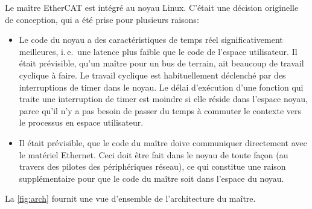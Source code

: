\documentclass[a4paper,12pt,BCOR6mm,bibtotoc,idxtotoc]{scrbook}
\begin{document}
Le ma\^itre EtherCAT est int\'egr\'e au noyau Linux. C'\'etait une
d\'ecision originelle de conception, qui a \'et\'e prise pour
plusieurs raisons:

\begin{itemize}

\item Le code du noyau a des caract\'eristiques de temps r\'eel
  significativement meilleures, i.\,e.\ une latence plus faible que le
  code de l'espace utilisateur. Il \'etait pr\'evisible, qu'un
  ma\^itre pour un bus de terrain, ait beaucoup de travail cyclique
  \`a faire.  Le travail cyclique est habituellement d\'eclench\'e par
  des interruptions de timer dans le noyau.  Le d\'elai d'ex\'ecution
  d'une fonction qui traite une interruption de timer est moindre si
  elle r\'eside dans l'espace noyau, parce qu'il n'y a pas besoin de
  passer du temps \`a commuter le contexte vers le processus en espace
  utilisateur.

\item Il \'etait pr\'evisible, que le code du ma\^itre doive
  communiquer directement avec le mat\'eriel Ethernet.  Ceci doit
  \^etre fait dans le noyau de toute fa\c{c}on (au travers des pilotes
  des p\'eriph\'eriques r\'eseau), ce qui constitue une raison
  suppl\'ementaire pour que le code du ma\^itre soit dans l'espace du
  noyau.

\end{itemize}

La \autoref{fig:arch} fournit une vue d'ensemble de l'architecture du
ma\^itre.
\end{document}
